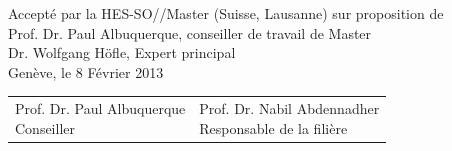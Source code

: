 \begin{titlepage}
\noindent
{Accept{\'e} par la HES-SO//Master (Suisse, Lausanne) sur proposition de} \\[1cm]
{Prof. Dr. Paul Albuquerque, conseiller de travail de Master} \\
{Dr. Wolfgang H{\"o}f\/le, Expert principal} \\[3cm]
{Gen{\`eve}, le 8 F{\'e}vrier 2013}\\ [6cm]
\begin{tabular}{ll}
    \parbox{7cm}{
        Prof. Dr. Paul Albuquerque\\
        Conseiller
    } &
    \parbox{5cm} {
        Prof. Dr. Nabil Abdennadher\\
        Responsable de la fili{\`e}re
    } \\ [3cm]
\end{tabular}
\end{titlepage}